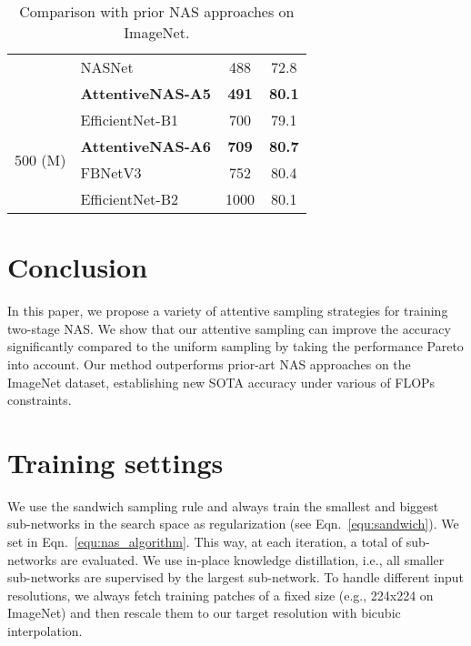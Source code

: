 \documentclass[final]{cvpr}
\theoremstyle{definition}
\begin{document}
\begin{table}[ht]
\begin{tabular}{clcc}
        & NASNet~\citep{zoph2018learning} & 488 & 72.8 \\
        & \textbf{AttentiveNAS-A5}   & \textbf{491} & \textbf{80.1} \\ \hline
         \multirow{4}{5em}{500 (M) } 
         & EfficientNet-B1~\cite{tan2019efficientnet} & 700 & 79.1 \\
         & \textbf{AttentiveNAS-A6}  & \textbf{709} & \textbf{80.7} \\ 
         & FBNetV3~\cite{dai2020fbnetv3} & 752 & {80.4} \\
         & EfficientNet-B2~\cite{tan2019efficientnet} & 1000 & 80.1 \\
         \hline
    \end{tabular}
    \caption{Comparison with prior NAS approaches on ImageNet.} 
    \label{tab:compare_with_sota}
\end{table}

 
\section{Conclusion}
In this paper, we propose a variety of attentive sampling strategies for training two-stage NAS. 
We show that our attentive sampling can improve the accuracy significantly compared to the uniform sampling by taking the performance Pareto into account. Our method outperforms prior-art NAS approaches on the ImageNet dataset, establishing new SOTA accuracy under various of FLOPs constraints.

{\small


}

\newpage
\onecolumn
\appendix

\section{Training settings}
\label{app:training_settings}
We use the sandwich sampling rule and always train the smallest and biggest sub-networks in the search space as regularization (see Eqn.~\eqref{equ:sandwich}). 
We set  in Eqn.~\eqref{equ:nas_algorithm}. This way, at each iteration, a total of  sub-networks are evaluated. 
We use in-place knowledge distillation, i.e.,
all smaller sub-networks are supervised by the largest sub-network. 
To handle different input resolutions, 
we always fetch training patches of a fixed size (e.g., 224x224 on ImageNet) and then rescale them to our target resolution with bicubic interpolation.
\end{document}
